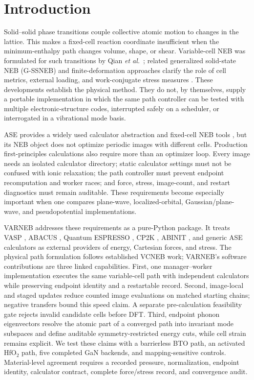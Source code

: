 \documentclass[final,5p,times,twocolumn]{elsarticle}
\begin{document}
\section{Introduction}
\label{sec:introduction}

Solid--solid phase transitions couple collective atomic motion to changes in
the lattice. This makes a fixed-cell reaction coordinate insufficient when the
minimum-enthalpy path changes volume, shape, or shear. Variable-cell NEB was
formulated for such transitions by Qian \emph{et al.}\ \cite{Qian2013}; related
generalized solid-state NEB (G-SSNEB) and finite-deformation approaches clarify
the role of cell metrics, external loading, and work-conjugate stress measures
\cite{Sheppard2012,Ghasemi2019}. These developments establish the physical
method. They do not, by themselves, supply a portable implementation in which
the same path controller can be tested with multiple electronic-structure
codes, interrupted safely on a scheduler, or interrogated in a vibrational
mode basis.

ASE provides a widely used calculator abstraction and fixed-cell NEB tools
\cite{Larsen2017}, but its NEB object does not optimize periodic images with
different cells. Production first-principles calculations also require more
than an optimizer loop. Every image needs an isolated calculator directory;
static calculator settings must not be confused with ionic relaxation; the
path controller must prevent endpoint recomputation and worker races; and
force, stress, image-count, and restart diagnostics must remain auditable.
These requirements become especially important when one compares plane-wave,
localized-orbital, Gaussian/plane-wave, and pseudopotential implementations.

VARNEB addresses these requirements as a pure-Python package. It treats VASP
\cite{Kresse1996a,Kresse1996b}, ABACUS \cite{Li2016}, Quantum ESPRESSO
\cite{Giannozzi2017}, CP2K \cite{Kuhne2020}, ABINIT \cite{Gonze2020}, and
generic ASE calculators as external providers of energy, Cartesian forces,
and stress. The physical path formulation follows established VCNEB work;
VARNEB's software contributions are three linked capabilities. First, one
manager--worker implementation executes the same variable-cell path with
independent calculators while preserving endpoint identity and a restartable
record. Second, image-local and staged updates reduce counted image
evaluations on matched starting chains; negative transfers bound this speed
claim. A separate pre-calculation feasibility gate rejects invalid candidate
cells before DFT. Third, endpoint phonon
eigenvectors resolve the atomic part of a converged path into invariant mode
subspaces and define auditable symmetry-restricted energy cuts, while cell
strain remains explicit. We test these claims with a
barrierless BTO path, an activated HfO$_2$ path, five completed GaN backends,
and mapping-sensitive controls. Material-level agreement requires a recorded
pressure, normalization, endpoint identity, calculator contract, complete
force/stress record, and convergence audit.
\end{document}
